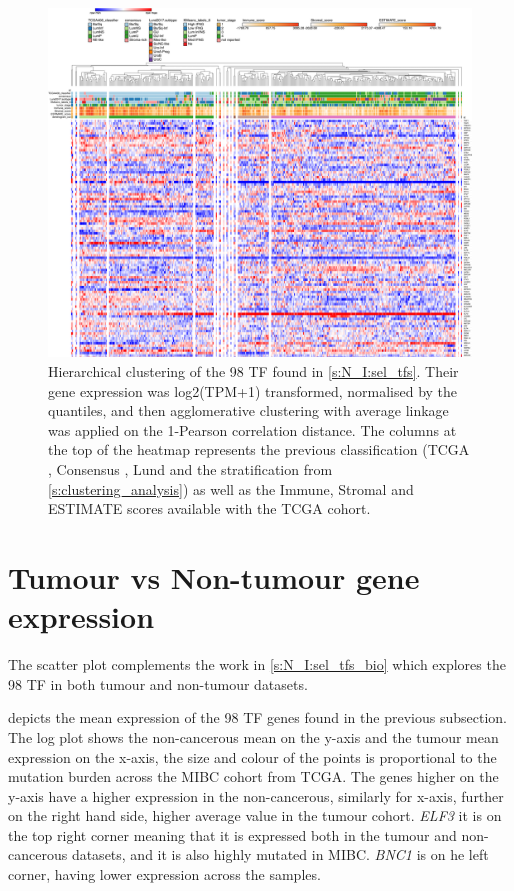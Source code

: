 \begin{figure}
    \centering
    \includegraphics[width=1.0\textwidth,keepaspectratio]{Sections/Network_I/Resources/selective_pruning/15_CS_norm_sel_tfs.png}
      \caption[Heatmap of the clustering of the gene expression of the 98 TF]{Hierarchical clustering of the 98 TF found in \cref{s:N_I:sel_tfs}. 
      Their gene expression was log2(TPM+1) transformed, normalised by the quantiles, and then agglomerative clustering with average linkage was applied on the 1-Pearson correlation distance. The columns at the top of the heatmap represents the previous classification (TCGA \cite{Robertson2017-mg}, Consensus \cite{Kamoun2020-tj}, Lund \cite{Marzouka2018-ge} and the stratification from \cref{s:clustering_analysis}) as well as the Immune, Stromal and ESTIMATE scores available with the TCGA cohort.}
    \label{fig:ap:morph_sel_tfs}
\end{figure}

\section{Tumour vs Non-tumour gene expression} \label{s:ap:tum_vs_non-tumour}


The scatter plot complements the work in \cref{s:N_I:sel_tfs_bio} which explores the 98 TF in both tumour and non-tumour datasets.

 depicts the mean expression of the 98 TF genes found in the previous subsection. The log plot shows the non-cancerous mean on the y-axis and the tumour mean expression on the x-axis, the size and colour of the points is proportional to the mutation burden across the MIBC cohort from TCGA. The genes higher on the y-axis have a higher expression in the non-cancerous, similarly for x-axis, further on the right hand side, higher average value in the tumour cohort. \textit{ELF3} it is on the top right corner meaning that it is expressed both in the tumour and non-cancerous datasets, and it is also highly mutated in MIBC. \textit{BNC1} is on he left corner, having lower expression across the samples.

